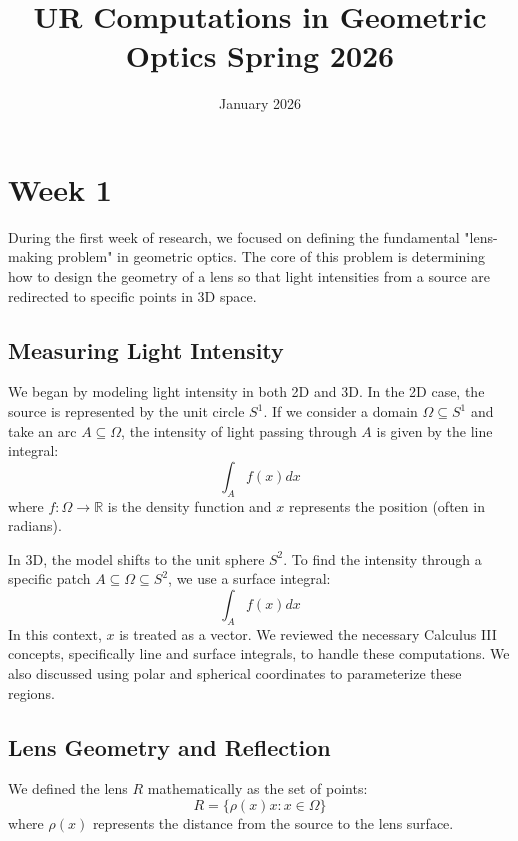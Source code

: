 \documentclass{article}
\title{UR Computations in Geometric Optics Spring 2026}
\date{January 2026}
\begin{document}
\maketitle

\section{Week 1}

During the first week of research, we focused on defining the fundamental "lens-making problem" in geometric optics. The core of this problem is determining how to design the geometry of a lens so that light intensities from a source are redirected to specific points in 3D space.

\subsection{Measuring Light Intensity}
We began by modeling light intensity in both 2D and 3D. In the 2D case, the source is represented by the unit circle $S^1$. If we consider a domain $\Omega \subseteq S^1$ and take an arc $A \subseteq \Omega$, the intensity of light passing through $A$ is given by the line integral:
\[ \int_A f(x) dx \]
where $f: \Omega \to \mathbb{R}$ is the density function and $x$ represents the position (often in radians).

In 3D, the model shifts to the unit sphere $S^2$. To find the intensity through a specific patch $A \subseteq \Omega \subseteq S^2$, we use a surface integral:
\[ \int_A f(x) dx \]
In this context, $x$ is treated as a vector. We reviewed the necessary Calculus III concepts, specifically line and surface integrals, to handle these computations. We also discussed using polar and spherical coordinates to parameterize these regions.

\subsection{Lens Geometry and Reflection}
We defined the lens $R$ mathematically as the set of points:
\[ R = \{ \rho(x)x : x \in \Omega \} \]
where $\rho(x)$ represents the distance from the source to the lens surface.
\end{document}
